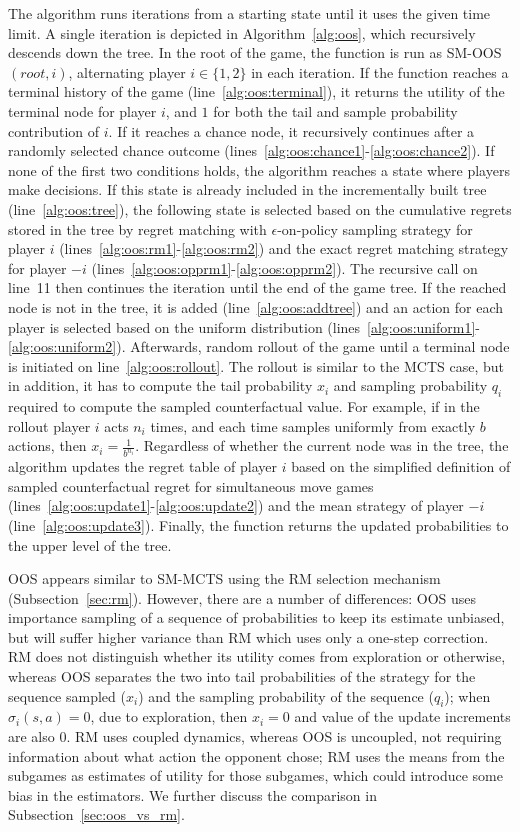 The algorithm runs iterations from a starting state until it uses the given time limit. A single iteration is depicted in Algorithm~\ref{alg:oos},
which recursively descends down the tree. In the root of the game, the function is run as SM-OOS$(root, i)$, alternating player $i\in\{1,2\}$ in
each iteration. If the function reaches a terminal history of the game (line~\ref{alg:oos:terminal}), it returns the utility of the terminal node
for player $i$, and $1$ for both the tail and sample probability contribution of $i$. If it reaches a chance node, it recursively continues after
a randomly selected chance outcome (lines~\ref{alg:oos:chance1}-\ref{alg:oos:chance2}). If none of the first two conditions holds, the algorithm
reaches a state where players make decisions. If this state is already included in the incrementally built tree (line~\ref{alg:oos:tree}), the
following state is selected based on the cumulative regrets stored in the tree by regret matching with $\epsilon$-on-policy sampling strategy for
player $i$ (lines~\ref{alg:oos:rm1}-\ref{alg:oos:rm2}) and the exact regret matching strategy for player $-i$ (lines~\ref{alg:oos:opprm1}-\ref{alg:oos:opprm2}).
The recursive call on line~11 then continues the iteration until the end of the game tree. If the reached node is not in the tree,
it is added (line~\ref{alg:oos:addtree}) and an action for each player is selected based on the uniform distribution
(lines~\ref{alg:oos:uniform1}-\ref{alg:oos:uniform2}). Afterwards, random rollout of the game until a terminal node is initiated on line~\ref{alg:oos:rollout}.
The rollout is similar to the MCTS case, but in addition, it has to compute the tail probability $x_i$ and sampling probability $q_i$
required to compute the sampled counterfactual value.
For example, if in the rollout player $i$ acts $n_i$ times, and each time samples uniformly from exactly $b$ actions, then $x_i = \frac{1}{b^{n_i}}$.
Regardless of whether the current node was in the tree, the algorithm updates the regret table of player $i$ based on the simplified definition of sampled counterfactual regret for simultaneous move games (lines~\ref{alg:oos:update1}-\ref{alg:oos:update2}) and the mean strategy of player $-i$ (line~\ref{alg:oos:update3}).
Finally, the function returns the updated probabilities to the upper level of the tree.

OOS appears similar to SM-MCTS using the RM selection mechanism (Subsection~\ref{sec:rm}). However, there are a number of differences:
OOS uses importance sampling of a sequence of probabilities to keep its estimate unbiased, but will suffer higher variance than RM which uses only a one-step correction.
RM does not distinguish whether its utility comes from exploration or otherwise, whereas OOS separates the two into tail probabilities of the strategy for the sequence
sampled ($x_i$) and the sampling probability of the sequence ($q_i$); when $\sigma_i(s,a) = 0$, due to exploration, then $x_i = 0$ and value of the update increments
are also $0$. RM uses coupled dynamics, whereas OOS is uncoupled, not requiring information about what action the opponent chose; RM uses the means from the subgames
as estimates of utility for those subgames, which could introduce some bias in the estimators. We further discuss the comparison in Subsection~\ref{sec:oos_vs_rm}.

